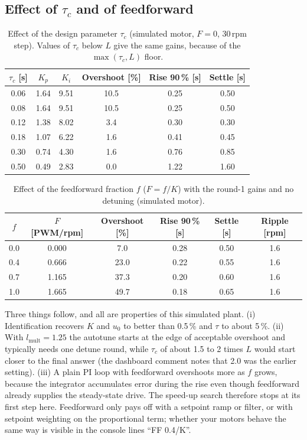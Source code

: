 \documentclass[11pt,a4paper]{report}
\begin{document}
\subsection{Effect of $\tau_c$ and of feedforward}
\begin{table}[H]
\centering
\caption{Effect of the design parameter $\tau_c$ (simulated motor, $F=0$, 30\,rpm step). Values of $\tau_c$ below $L$ give the same gains, because of the $\max(\tau_c,L)$ floor.}
\small
\begin{tabular}{@{}cccccc@{}}
\toprule
$\tau_c$ [s] & $K_p$ & $K_i$ & Overshoot [\%] & Rise 90\,\% [s] & Settle [s]\\
\midrule
0.06 & 1.64 & 9.51 & 10.5 & 0.25 & 0.50\\
0.08 & 1.64 & 9.51 & 10.5 & 0.25 & 0.50\\
0.12 & 1.38 & 8.02 & 3.4 & 0.30 & 0.30\\
0.18 & 1.07 & 6.22 & 1.6 & 0.41 & 0.45\\
0.30 & 0.74 & 4.30 & 1.6 & 0.76 & 0.85\\
0.50 & 0.49 & 2.83 & 0.0 & 1.22 & 1.60\\
\bottomrule
\end{tabular}
\end{table}

\begin{table}[H]
\centering
\caption{Effect of the feedforward fraction $f$ ($F=f/K$) with the round-1 gains and no detuning (simulated motor).}
\small
\begin{tabular}{@{}cccccc@{}}
\toprule
$f$ & $F$ [PWM/rpm] & Overshoot [\%] & Rise 90\,\% [s] & Settle [s] & Ripple [rpm]\\
\midrule
0.0 & 0.000 & 7.0 & 0.28 & 0.50 & 1.6\\
0.4 & 0.666 & 23.0 & 0.22 & 0.55 & 1.6\\
0.7 & 1.165 & 37.3 & 0.20 & 0.60 & 1.6\\
1.0 & 1.665 & 49.7 & 0.18 & 0.65 & 1.6\\
\bottomrule
\end{tabular}
\end{table}

Three things follow, and all are properties of this simulated plant. (i) Identification recovers $K$ and $u_0$ to better than 0.5\,\% and $\tau$ to about 5\,\%. (ii) With $l_{\text{mult}}=1.25$ the autotune starts at the edge of acceptable overshoot and typically needs one detune round, while $\tau_c$ of about 1.5 to 2 times $L$ would start closer to the final answer (the dashboard comment notes that 2.0 was the earlier setting). (iii) A plain PI loop with feedforward overshoots more as $f$ grows, because the integrator accumulates error during the rise even though feedforward already supplies the steady-state drive. The speed-up search therefore stops at its first step here. Feedforward only pays off with a setpoint ramp or filter, or with setpoint weighting on the proportional term; whether your motors behave the same way is visible in the console lines ``FF 0.4/K''.
\end{document}
